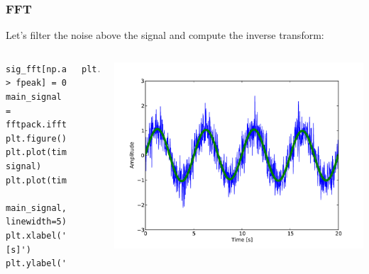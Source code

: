 \documentclass[10pt,colorlinks]{beamer}
\begin{document}
\begin{frame}[fragile]\frametitle{FFT}
  
Let's filter the noise above the signal and compute the inverse transform: 

\begin{columns}[c]
\small 
\begin{verbatim}
sig_fft[np.abs(freqs) > fpeak] = 0
main_signal = fftpack.ifft(sig_fft)
plt.figure()
plt.plot(time_vector, signal)
plt.plot(time_vector, 
    main_signal, linewidth=5)
plt.xlabel('Time [s]')
plt.ylabel('Amplitude')
\end{verbatim}

\begin{verbatim}
plt.show()
\end{verbatim}
\includegraphics[width=\textwidth]{plwfigis/CursP_3_figure36}

\end{columns}
\end{frame}
\end{document}
